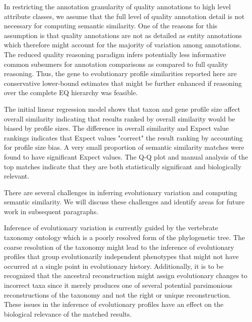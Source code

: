 \documentclass{article}
\begin{document}

In restricting the annotation granularity of quality annotations to high level attribute classes, we assume that the full level of quality annotation detail is not necessary for computing semantic similarity. One of the reasons for this assumption is that quality annotations are not as detailed as entity annotations which therefore might account for the majority of variation among annotations. The reduced quality reasoning paradigm infers potentially less informative common subsumers for annotation comparisons as compared to full quality reasoning. Thus, the gene to evolutionary profile similarities reported here are conservative lower-bound estimates that might be further enhanced if reasoning over the complete EQ hierarchy was feasible.
 
 
The initial linear regression model shows that taxon and gene profile size affect overall similarity indicating that results ranked by overall similarity would be biased by profile sizes. The difference in overall similarity and Expect value rankings indicates that Expect values "correct" the result ranking by accounting for profile size bias. A very small proportion of semantic similarity matches were found to have significant Expect values. The Q-Q plot and manual analysis of the top matches indicate that they are both statistically significant and biologically relevant.




There are several challenges in inferring evolutionary variation and computing semantic similarity. We will discuss these challenges and identify areas for future work in subsequent paragraphs. 

Inference of evolutionary variation is currently guided by the vertebrate taxonomy ontology which is a poorly resolved form of the phylogenetic tree. The coarse resolution of the taxonomy might lead to the inference of evolutionary profiles that group evolutionarily independent phenotypes that might not have occurred at a single point in evolutionary history. Additionally, it is to be recognized that the ancestral reconstruction might assign evolutionary changes to incorrect taxa since it merely produces one of several potential parsimonious reconstructions of the taxonomy and not the right or unique reconstruction. These issues in the inference of evolutionary profiles have an effect on the biological relevance of the matched results. 
\end{document}
